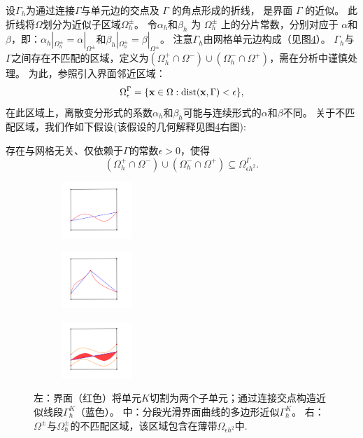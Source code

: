 设$\Gamma_h$为通过连接$\Gamma$与单元边的交点及 $\Gamma$ 的角点形成的折线，
是界面 $\Gamma$ 的近似。
此折线将$\Omega$划分为近似子区域$\Omega^{\pm}_h$。
令$\alpha_h$和$\beta_h$ 为 $\Omega_h^{\pm}$ 上的分片常数，分别对应于
$\alpha$和$\beta$，即：$\alpha_h|_{\Omega^{\pm}_h} =
\alpha|_{\Omega^{\pm}}$和$\beta_h|_{\Omega^{\pm}_h} = \beta|_{\Omega^{\pm}}$。
注意$\Gamma_h$由网格单元边构成（见图\ref{fig:interfelem}）。
$\Gamma_h$与$\Gamma$之间存在不匹配的区域，定义为$(\Omega^+_h\cap \Omega^-)\cup
(\Omega^-_h\cap \Omega^+)$，需在分析中谨慎处理。
为此，参照\cite{2010LiMelenkWohlmuthZou}引入界面邻近区域：
\begin{equation}
\label{OmegaGamma}
\Omega^{\Gamma}_{\epsilon} = \{ \mathbf{x}\in \Omega: \mathrm{dist}(\mathbf{x},\Gamma)< \epsilon \},
\end{equation}
{在此区域上，离散变分形式的系数$\alpha_h$和$\beta_h$可能与连续形式的$\alpha$和$\beta$不同。}
关于不匹配区域，我们作如下假设(该假设的几何解释见图\ref{fig:interfelem}右图):
\begin{assumption}
\label{interf_eps}
存在与网格无关、仅依赖于$\Gamma$的常数$\epsilon>0$，使得
\begin{equation}
\label{interf_eps_eq}
(\Omega^+_h\cap \Omega^-)\cup (\Omega^-_h\cap \Omega^+) \subseteq \Omega^{\Gamma}_{\epsilon h^2}.
\end{equation}
\end{assumption}

\begin{figure}[h]
\centering
\begin{subfigure}{.2\textwidth}
\includegraphics[width=1.05in]{./figures/maxwell/interfelem1}
\label{fig:interfelem1}
\end{subfigure}
\begin{subfigure}{.2\textwidth}
\includegraphics[width=1.05in]{./figures/maxwell/interfelem3}
\label{fig:interfelem2}
\end{subfigure}
\begin{subfigure}{.2\textwidth}
\includegraphics[width=1.05in]{./figures/maxwell/interfelem2}
\label{fig:interfelem3}
\end{subfigure}
\caption{左：界面（红色）将单元$K$切割为两个子单元；通过连接交点构造近似线段$\Gamma^K_h$（蓝色）。
中：分段光滑界面曲线的多边形近似$\Gamma^K_h$。
右：$\Omega^{\pm}$与$\Omega^{\pm}_h$的不匹配区域，该区域包含在薄带$\Omega_{\epsilon
h^2}$中.}
\label{fig:interfelem}
\end{figure}

